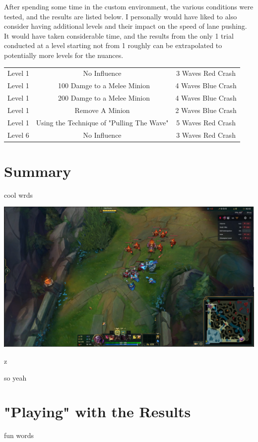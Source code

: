 \documentclass{article}
\begin{document}
After spending some time in the custom environment, the various conditions were tested, and the results are listed below. I personally would have liked to also consider having additional levels and their impact on the speed of lane pushing. It would have taken considerable time, and the results from the only 1 trial conducted at a level starting not from 1 roughly can be extrapolated to potentially more levels for the nuances.
\begin{center}
\begin{tabular}{ c c c}
  Level 1 & No Influence & 3 Waves Red Crash\\ 
  Level 1 & ~100 Damge to  a Melee Minion & 4 Waves Blue Crash\\  
  Level 1 & ~200 Damge to  a Melee Minion & 4 Waves Blue Crash\\  
  Level 1 & Remove A Minion & 2 Waves Blue Crash\\  
  Level 1 & Using the Technique of "Pulling The Wave"  & 5 Waves Red Crash\\
  Level 6 & No Influence  & 3 Waves Red Crash
\end{tabular}
\end{center}


\newpage
\section{Summary}

cool wrds\\
\begin{table}[h]
\includegraphics[width=\textwidth]{Crash.PNG}
\caption[A duck]{z}
so yeah

\end{table}


\newpage
\section{"Playing" with the Results}
fun words
\end{document}
